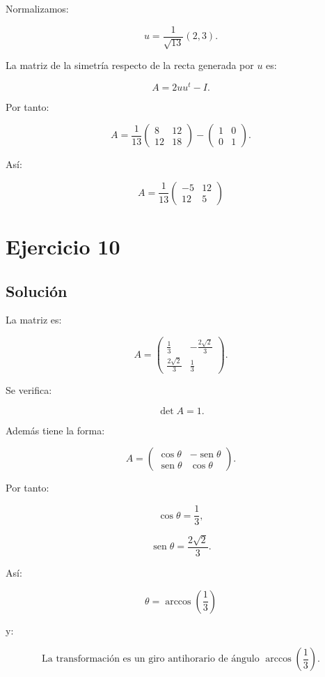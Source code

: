 \documentclass[11pt,a4paper]{article}
\newcommand{\sen}{\operatorname{sen}}
\begin{document}
Normalizamos:

\[
u=
\frac1{\sqrt{13}}(2,3).
\]

La matriz de la simetría respecto de la recta generada por \(u\) es:

\[
A
=
2uu^t-I.
\]

Por tanto:

\[
A
=
\frac1{13}
\begin{pmatrix}
8&12\\
12&18
\end{pmatrix}
-
\begin{pmatrix}
1&0\\
0&1
\end{pmatrix}.
\]

Así:

\[
\boxed{
A=
\frac1{13}
\begin{pmatrix}
-5&12\\
12&5
\end{pmatrix}
}
\]

\section{Ejercicio 10}
\subsection{Solución}

La matriz es:

\[
A=
\begin{pmatrix}
\frac13&-\frac{2\sqrt2}{3}\\[1mm]
\frac{2\sqrt2}{3}&\frac13
\end{pmatrix}.
\]

Se verifica:

\[
\det A=1.
\]

Además tiene la forma:

\[
A=
\begin{pmatrix}
\cos\theta&-\sen\theta\\
\sen\theta&\cos\theta
\end{pmatrix}.
\]

Por tanto:

\[
\cos\theta=\frac13,
\]

\[
\sen\theta=\frac{2\sqrt2}{3}.
\]

Así:

\[
\boxed{
\theta
=
\arccos\left(\frac13\right)
}
\]

y:

\[
\boxed{
\text{La transformación es un giro antihorario de ángulo }
\arccos\left(\frac13\right).
}
\]
\end{document}
